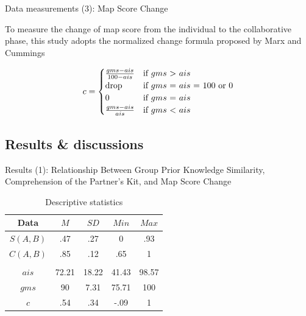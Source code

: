 \begin{frame}{Data measurements (3): Map Score Change}

To measure the change of map score from the individual to the collaborative phase, this 
study adopts the normalized change formula proposed by Marx and Cummings 


\begin{equation}
 c =
    \begin{cases}
        \frac{gms - ais}{100 - ais} & \text{if $gms$ > $ais$}\\
        $drop$ & \text{if $gms$ = $ais$ = 100 or 0} \\
        0 & \text{if $gms$ = $ais$}\\
        \frac{gms - ais}{ais} & \text{if $gms$ < $ais$}
    \end{cases}
    \label{eq:7}
\end{equation}
    
\end{frame}


\subsection{Results \& discussions}
\begin{frame}{Results (1): Relationship Between Group Prior Knowledge Similarity, 
   Comprehension of the Partner’s Kit, and Map Score Change}

\begin{table}[tb]
    \caption{Descriptive statistics}
    \label{desc_stat}
    \begin{center}
        \begin{tabular}{c|c|c|c|c}
            \hline
            Data & $M$ & $SD$ & $Min$ & $Max$\\
            \hline
            $S(A, B)$ & .47 & .27 & 0 & .93 \\
            $C(A, B)$ & .85 & .12 & .65 & 1 \\
            & & & &\\
            $ais$ & 72.21 & 18.22 & 41.43 & 98.57 \\
            $gms$ & 90 & 7.31 & 75.71 & 100 \\
            $c$ & .54 & .34 & -.09 & 1 \\
            \hline
        \end{tabular}
    \end{center}
\end{table}
\end{frame}



